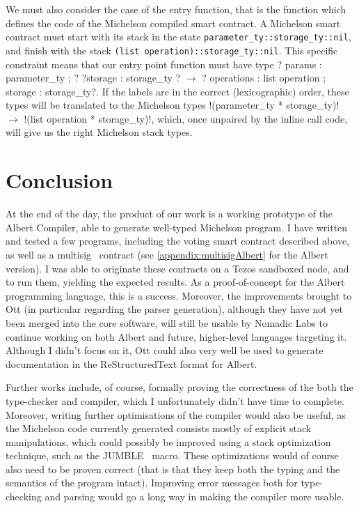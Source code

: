 \documentclass{report}
\begin{document}
We must also consider the case of the entry function, that is the function which defines the code of the Michelson compiled smart contract. A Michelson smart contract must start with its stack in the state \texttt{parameter\_ty::storage\_ty::nil}, and finish with the stack \texttt{(list operation)::storage\_ty::nil}. This specific constraint means that our entry point function must have type ?{ params : parameter_ty ; ? ?storage : storage_ty }? $\rightarrow$ ?{ operations : list operation ; storage : storage_ty}?. If the labels are in the correct (lexicographic) order, these types will be translated to the Michelson types !(parameter_ty * storage_ty)! $\rightarrow$ !(list operation * storage_ty)!, which, once unpaired by the inline call code, will give us the right Michelson stack types.

\chapter*{Conclusion}

At the end of the day, the product of our work is a working prototype of the Albert Compiler, able to generate well-typed Michelson program. I have written and tested a few programs, including the voting smart contract described above, as well as a multisig~\cite{multisigArthur} contract (see \ref{appendix:multisigAlbert} for the Albert version). I was able to originate these contracts on a Tezos sandboxed node, and to run them, yielding the expected results. As a proof-of-concept for the Albert programming language, this is a success. Moreover, the improvements brought to Ott (in particular regarding the parser generation), although they have not yet been merged into the core software, will still be usable by Nomadic Labs to continue working on both Albert and future, higher-level languages targeting it. Although I didn't focus on it, Ott could also very well be used to generate documentation in the ReStructuredText format for Albert.

Further works include, of course, formally proving the correctness of the both the type-checker and compiler, which I unfortunately didn't have time to complete. Moreover, writing further optimisations of the compiler would also be useful, as the Michelson code currently generated consists mostly of explicit stack manipulations, which could possibly be improved using a stack optimization technique, such as the JUMBLE~\cite{jumble} macro. These optimizations would of course also need to be proven correct (that is that they keep both the typing and the semantics of the program intact). Improving error messages both for type-checking and parsing would go a long way in making the compiler more usable.\\
\end{document}
